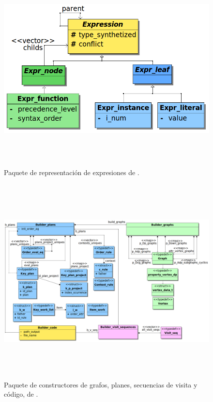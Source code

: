 \begin{figure}[!ht]\centering
\includegraphics[width=479pt, height=300pt, angle=90]{diagramas/Expression2.png}
\caption{\label{fig:dia-express}Paquete de representación de expresiones de \maggen.}
\end{figure}

\begin{figure}[!ht]\centering
\includegraphics[width=505pt, height=300pt, angle=90]{diagramas/Builder.png}
\caption{\label{fig:dia-builders}Paquete de constructores de grafos, planes, secuencias de visita y código, de \maggen.}
\end{figure}

